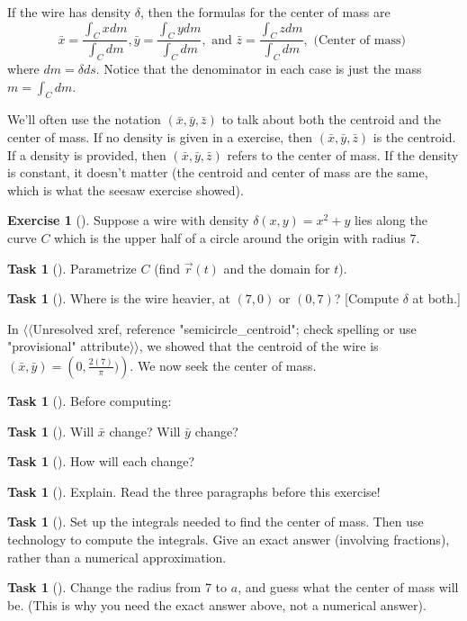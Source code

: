 \documentclass[10pt,]{book}
\theoremstyle{plain}
\theoremstyle{definition}
\theoremstyle{definition}
\theoremstyle{definition}
\theoremstyle{definition}
\newtheorem{exploration}[project]{Exercise}
\newtheorem{task}[project]{Task}
\theoremstyle{definition}
\numberwithin{equation}{section}
\begin{document}
\par
If the wire has density \(\delta\), then the formulas for the center of mass are %
\begin{equation*}
\bar x = \frac{\int_C x dm}{\int_C  dm},
\bar y = \frac{\int_C y dm}{\int_C  dm}, 
\text{ and } 
\bar z = \frac{\int_C z dm}{\int_C  dm},  \text{ (Center of mass) }
\end{equation*}
where \(dm=\delta ds\). Notice that the denominator in each case is just the mass \(m=\int_C dm\).%
\par
We'll often use the notation \((\bar x, \bar y,\bar z)\) to talk about both the centroid and the center of mass. If no density is given in a exercise, then \((\bar x, \bar y,\bar z)\) is the centroid. If a density is provided, then \((\bar x, \bar y,\bar z)\) refers to the center of mass. If the density is constant, it doesn't matter (the centroid and center of mass are the same, which is what the seesaw exercise showed).%
\begin{exploration}[]\label{exploration-223}
Suppose a wire with density \(\delta(x,y)=x^2+y\) lies along the curve \(C\) which is the upper half of a circle around the origin with radius \(7\).%
\begin{task}[]\label{task-577}
Parametrize \(C\) (find \(\vec r(t)\) and the domain for \(t\)).%
\end{task}
\begin{task}[]\label{task-578}
Where is the wire heavier, at \((7,0)\) or \((0,7)\)? [Compute \(\delta\) at both.]%
\end{task}
In {$\langle\langle$Unresolved xref, reference "semicircle\_centroid"; check spelling or use "provisional" attribute$\rangle\rangle$}, we showed that the centroid of the wire is \((\bar x, \bar y) = \left(0,\frac{2(7)}{\pi})\right)\). We now seek the center of mass.%
\begin{task}[]\label{task-579}
Before computing:%
\begin{task}[]\label{task-580}
Will \(\bar x\) change? Will \(\bar y\) change?%
\end{task}
\begin{task}[]\label{task-581}
How will each change?%
\end{task}
\begin{task}[]\label{task-582}
Explain. Read the three paragraphs before this exercise!%
%
\end{task}
\end{task}
\begin{task}[]\label{task-583}
Set up the integrals needed to find the center of mass. Then use technology to compute the integrals. Give an exact answer (involving fractions), rather than a numerical approximation.%
\end{task}
\begin{task}[]\label{task-584}
Change the radius from 7 to \(a\), and guess what the center of mass will be.  (This is why you need the exact answer above, not a numerical answer).%
\end{task}
\end{exploration}
\typeout{************************************************}
\typeout{************************************************}
\end{document}
